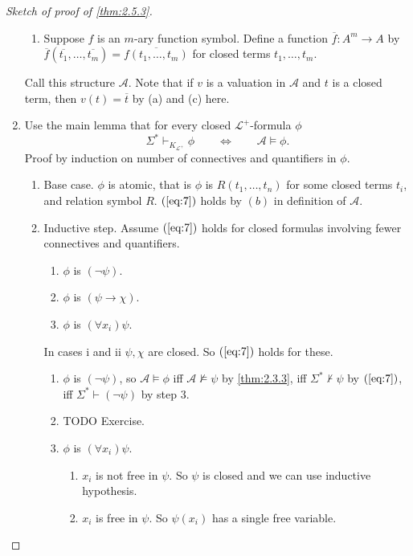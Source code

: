 \documentclass{article}
\newcommand{\A}{\mathcal{A}}
\renewcommand{\L}{\mathcal{L}}
\newcommand{\rb}[1]{\left( #1 \right)}
\newcommand{\notb}[1]{\rb{\neg #1}}
\newcommand{\impb}[2]{\rb{#1 \rightarrow #2}}
\newcommand{\fab}[1]{\rb{\forall #1}}
\theoremstyle{definition}\newtheorem{definition}{Definition}[subsection]
\theoremstyle{definition}\newtheorem{remark}[definition]{Remark}
\theoremstyle{definition}\newtheorem*{example}{Example}
\theoremstyle{definition}\newtheorem*{note}{Note}
\begin{document}
\begin{proof}[Sketch of proof of \ref{thm:2.5.3}]
\begin{enumerate}
\begin{enumerate}
\item Suppose $ f $ is an $ m $-ary function symbol. Define a function $ \overline{f} : A^m \to A $ by $ \overline{f}\rb{\overline{t_1}, \dots, \overline{t_m}} = \overline{f\rb{t_1, \dots, t_m}} $ for closed terms $ t_1, \dots, t_m $.
\end{enumerate}
Call this structure $ \A $. Note that if $ v $ is a valuation in $ \A $ and $ t $ is a closed term, then $ v\rb{t} = \overline{t} $ by (a) and (c) here.
\item Use the main lemma that for every closed $ \L^+ $-formula $ \phi $
\begin{equation}
\label{eq:7}
\Sigma^* \vdash_{K_{\L^+}} \phi \qquad \iff \qquad \A \vDash \phi.
\end{equation}
Proof by induction on number of connectives and quantifiers in $ \phi $.
\begin{enumerate}
\item Base case. $ \phi $ is atomic, that is $ \phi $ is $ R\rb{t_1, \dots, t_n} $ for some closed terms $ t_i $, and relation symbol $ R $. $ \rb{\ref{eq:7}} $ holds by $ (b) $ in definition of $ \A $.
\item Inductive step. Assume $ \rb{\ref{eq:7}} $ holds for closed formulas involving fewer connectives and quantifiers.
\begin{enumerate}
\item $ \phi $ is $ \notb{\psi} $.
\item $ \phi $ is $ \impb{\psi}{\chi} $.
\item $ \phi $ is $ \fab{x_i}\psi $.
\end{enumerate}
In cases i and ii $ \psi, \chi $ are closed. So $ \rb{\ref{eq:7}} $ holds for these.
\begin{enumerate}
\item $ \phi $ is $ \notb{\psi} $, so $ \A \vDash \phi $ iff $ \A \not\vDash \psi $ by \ref{thm:2.3.3}, iff $ \Sigma^* \not\vdash \psi $ by $ \rb{\ref{eq:7}} $, iff $ \Sigma^* \vdash \notb{\psi} $ by step $ 3 $.
\item TODO Exercise.
\item $ \phi $ is $ \fab{x_i}\psi $.
\begin{enumerate}
\item $ x_i $ is not free in $ \psi $. So $ \psi $ is closed and we can use inductive hypothesis.
\item $ x_i $ is free in $ \psi $. So $ \psi\rb{x_i} $ has a single free variable.
\end{enumerate}
\end{enumerate}

\end{enumerate}
\end{enumerate}
\end{proof}
\end{document}
